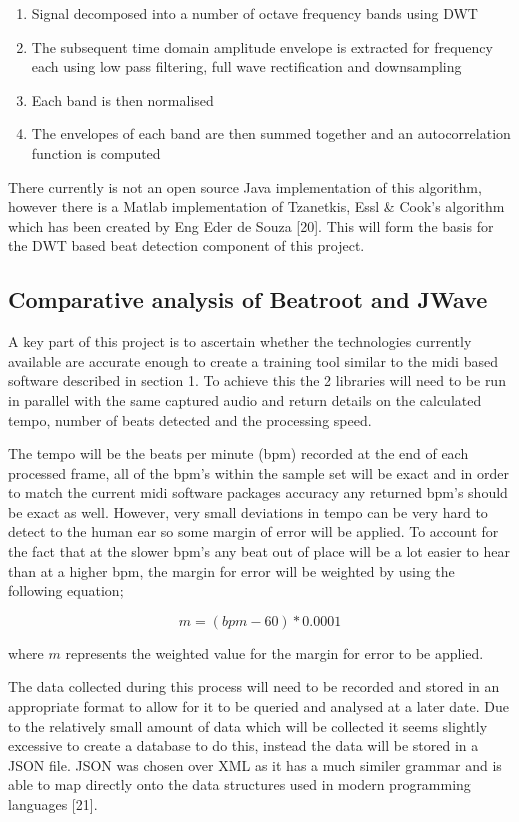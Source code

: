 \documentclass[a4paper, 11pt]{article}
\begin{document}
\begin{enumerate}
\item Signal decomposed into a number of octave frequency bands using DWT
\item The subsequent time domain amplitude envelope is extracted for frequency each using low pass filtering, full wave rectification and downsampling
\item Each band is then normalised
\item The envelopes of each band are then summed together and an autocorrelation function is computed
\end{enumerate}

There currently is not an open source Java implementation of this algorithm, however there is a Matlab implementation of Tzanetkis, Essl \& Cook's algorithm which has been created by Eng Eder de Souza [20]. This will form the basis for the DWT based beat detection component of this project.

\subsection{Comparative analysis of Beatroot and JWave}
A key part of this project is to ascertain whether the technologies currently available are accurate enough to create a training tool similar to the midi based software described in section 1. To achieve this the 2 libraries will need to be run in parallel with the same captured audio and return details on the calculated tempo, number of beats detected and the processing speed. 

The tempo will be the beats per minute (bpm) recorded at the end of each processed frame, all of the bpm's within the sample set will be exact and in order to match the current midi software packages accuracy any returned bpm's should be exact as well. However, very small deviations in tempo can be very hard to detect to the human ear so some margin of error will be applied. To account for the fact that at the slower bpm's any beat out of place will be a lot easier to hear than at a higher bpm, the margin for error will be weighted by using the following equation;

\[ m = (bpm - 60) * 0.0001\]
\begin{flushleft}
where \(m\) represents the weighted value for the margin for error to be applied.
\end{flushleft}
The data collected during this process will need to be recorded and stored in an appropriate format to allow for it to be queried and analysed at a later date. Due to the relatively small amount of data which will be collected it seems slightly excessive to create a database to do this, instead the data will be stored in a JSON file. JSON was chosen over XML as it has a much similer grammar and is able to map directly onto the data structures used in modern programming languages [21].
\end{document}
